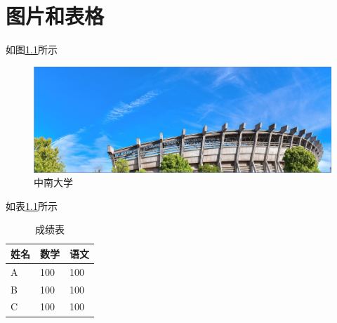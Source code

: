 \chapter{图片和表格}
如图\ref{fig:csu}所示
\begin{figure}[H]
	\centering
	\includegraphics[width=0.8\linewidth]{figures/csu}
	\caption{中南大学}
	\label{fig:csu}%
\end{figure}

如表\ref{tab:example_table}所示
\begin{table}[H]
	\centering
	\caption{成绩表}\label{tab:example_table}
	\begin{tabular}{lll}
		\toprule
		姓名& 数学  &  语文\\
		\midrule
		A& 100 & 100  \\
		
		B& 100 & 100 \\
		
		C& 100 & 100 \\	
		\bottomrule
	\end{tabular}
\end{table}
